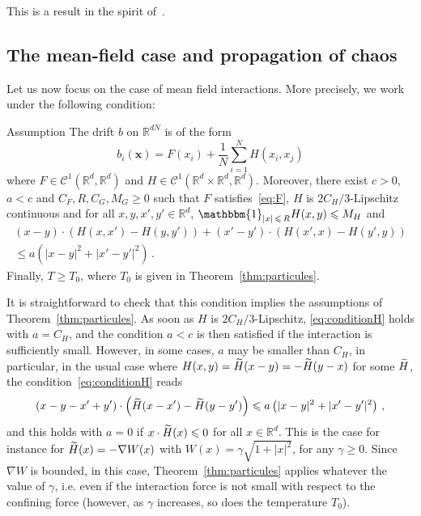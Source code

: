 \documentclass[10pt]{amsart}
\theoremstyle{definition}\newtheorem{defi}[theo]{Definition}\newtheorem{rema}[theo]{Remark}\newtheorem{exam}[theo]{Example}\newtheorem{exem}[theo]{Example}\newtheorem{nota}[theo]{Notation}
\newcommand{\R}{\mathbb R}
\newcommand{\clC}{\mathcal C}
\newcommand{\na}{\nabla}
\newcommand{\1}{\mathbbm{1}}
\newcommand{\bx}{\mathbf{x}}
\let\oldtilde\tilde
\renewcommand*{\tilde}[1]{\mathchoice{\widetilde{#1}}{\widetilde{#1}}{\oldtilde{#1}}{\oldtilde{#1}}}
\begin{document}
This is a result in the spirit of~\cite[Theorem~1]{GuillinWuZhang}.

\subsection{The mean-field case and propagation of chaos}

Let us now focus on the case of mean field interactions. More precisely, we work under the following condition:

\begin{enonce}
{Assumption }\label{AssuChaos}
The drift $b$ on $\R^{dN}$ is of the form
\[
b_i(\bx) = F(x_i) + \frac1N \sum_{i=1}^N H(x_i,x_j)
\]
where $F\in\clC^1 (\R^d,\R^d)$ and $H\in\clC^1(\R^d\times\R^d,\R^d)$. Moreover, there exist $c>0$, $a<c$ and $C_F,R,C_G,M_G\geqslant 0$ such that $F$ satisfies~\eqref{eq:F}, $H$ is $2C_H/3$-Lipschitz continuous and for all $x,y,x',y'\in\R^d$, $\1_{|x|\,\leqslant\,R} H(x,y)\leqslant M_H$ and
\begin{multline}\label{eq:conditionH}
(x-y)\cdot (H(x,x')-H(y,y')) + (x'-y')\cdot (H(x',x)-H(y',y)) \\
\leqslant a\left( |x-y|^2 + |x'-y'|^2\right)\,.
\end{multline}
Finally, $T\geqslant T_0$, where $T_0$ is given in Theorem~\ref{thm:particules}.
\end{enonce}

It is straightforward to check that this condition implies the assumptions of Theorem~\ref{thm:particules}. As soon as $H$ is $2C_H/3$-Lipschitz, \eqref{eq:conditionH} holds with $a=C_H$, and the condition $a<c$ is then satisfied if the interaction is sufficiently small. However, in some cases, $a$ may be smaller than $C_H$, in particular, in the usual case where $H(x,y)=\tilde H(x-y)=-\tilde H(y-x)$ for some $\tilde H$, the condition~\eqref{eq:conditionH} reads
\[
(x-y-x'+y')\cdot \left(\tilde H(x-x')-\tilde H(y-y')\right) \leqslant a\left( |x-y|^2 + |x'-y'|^2\right)\,,
\]
and this holds with $a=0$ if $x\cdot \tilde H(x) \leqslant 0$ for all $x\in\R^d$. This is the case for instance for $\tilde H(x) = -\na W(x)$ with $W(x) = \gamma \sqrt{1+|x|^2}$, for any $\gamma\geqslant 0$. Since $\na W$ is bounded, in this case, Theorem~\ref{thm:particules} applies whatever the value of $\gamma$, i.e. even if the interaction force is not small with respect to the confining force (however, as $\gamma$ increases, so does the temperature $T_0$).
\end{document}
